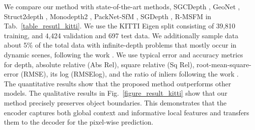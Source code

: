 \documentclass[letterpaper]{article} \usepackage{aaai23}  \usepackage{times}  \usepackage{helvet}  \usepackage{courier}  \usepackage[hyphens]{url}  \usepackage{graphicx} \urlstyle{rm} \def\UrlFont{\rm}  \usepackage{natbib}  \usepackage{caption} \frenchspacing  \setlength{\pdfpagewidth}{8.5in} \setlength{\pdfpageheight}{11in} \usepackage{algorithm}
\newcommand{\tabref}[1]{Tab.~\ref{#1}}
\newcommand{\figref}[1]{Fig.~\ref{#1}}
\begin{document}
\begin{table}[t]
    \centering
        \caption{\textbf{Quantitative comparison to state-of-the-arts.} We evaluate models trained on KITTI (K) with an input image size of $640 \times 192$.  We only use monocular images (M) for supervision.  \textbf{Bold} is the best performance.}
        \label{table_resutl_kitti}
\end{table}


We compare our method with state-of-the-art methods, SGCDepth {\cite{xiong2021self}}, GeoNet {\cite{yin2018geonet}}, Struct2depth {\cite{casser2019depth}}, Monodepth2 {\cite{godard2019digging}}, PackNet-SfM {\cite{guizilini20203d}}, SGDepth {\cite{klingner2020self}}, R-MSFM {\cite{zhou2021r}} in \tabref{table_resutl_kitti}.
We use the KITTI Eigen split \cite{geiger2013vision,eigen2015predicting} consisting of 39,810 training, and 4,424 validation and 697 test data. 
We additionally sample data about 5\% of the total data with infinite-depth problems that mostly occur in dynamic scenes, following the work \cite{guizilini2020semantically}. 
We use typical error and accuracy metrics for depth, absolute relative (Abs Rel), square relative (Sq Rel), root-mean-square-error (RMSE), its log (RMSElog), and the ratio of inliers following the work \cite{guizilini20203d}.
The quantitative results show that the proposed method outperforms other models. 
The qualitative results in \figref{figure_result_kitti} show that our method precisely preserves object boundaries. This demonstrates that the encoder captures both global context and informative local features and transfers them to the decoder for the pixel-wise prediction.
\end{document}
